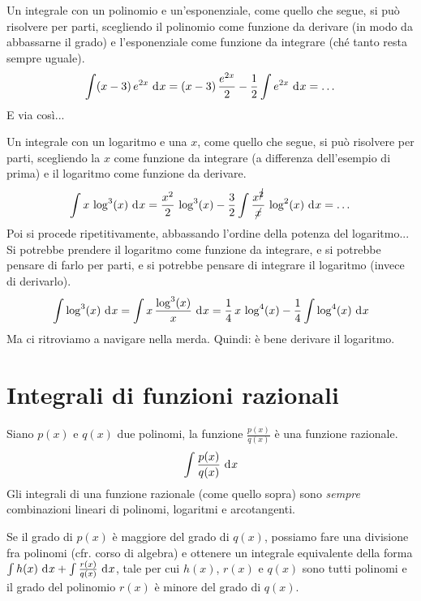 \begin{exmp}
Un integrale con un polinomio e un'esponenziale, come quello che segue, si pu\`o risolvere per parti, scegliendo il polinomio come funzione da derivare (in modo da abbassarne il grado) e l'esponenziale come funzione da integrare (ch\'e tanto resta sempre uguale).
\[
\int (x - 3) \, e^{2x} \dx =
(x - 3) \, \frac{e^{2x}}{2} - \frac{1}{2} \int e^{2x} \dx = \dots
\]
E via cos\`i...
\end{exmp}

\begin{exmp}
Un integrale con un logaritmo e una $x$, come quello che segue, si pu\`o risolvere per parti, scegliendo la $x$ come funzione da integrare (a differenza dell'esempio di prima) e il logaritmo come funzione da derivare.
\[
\int x \, \log^3 (x) \dx =
\frac{x^2}{2} \, \log^3 (x) - \frac{3}{2} \int \frac{x^{\cancel{2}}}{\cancel{x}} \, \log^2 (x) \dx = \dots
\]
Poi si procede ripetitivamente, abbassando l'ordine della potenza del logaritmo... Si potrebbe prendere il logaritmo come funzione da integrare, e si potrebbe pensare di farlo per parti, e si potrebbe pensare di integrare il logaritmo (invece di derivarlo).
\[
\int \log^3 (x) \dx =
\int x \, \frac{\log^3 (x)}{x} \dx =
\frac{1}{4} \, x \, \log^4 (x) - \frac{1}{4} \int \log^4 (x) \dx
\]
Ma ci ritroviamo a navigare nella merda. Quindi: \`e bene derivare il logaritmo.
\end{exmp}

\section{Integrali di funzioni razionali}

Siano $p(x)$ e $q(x)$ due polinomi, la funzione $\frac{p(x)}{q(x)}$ \`e una funzione razionale.
\[
\int \frac{p(x)}{q(x)} \dx
\]
Gli integrali di una funzione razionale (come quello sopra) sono \emph{sempre} combinazioni lineari di polinomi, logaritmi e arcotangenti.

Se il grado di $p(x)$ \`e maggiore del grado di $q(x)$, possiamo fare una divisione fra polinomi (cfr. corso di algebra) e ottenere un integrale equivalente della forma $\int h(x) \dx + \int \frac{r(x)}{q(x)} \dx$, tale per cui $h(x)$, $r(x)$ e $q(x)$ sono tutti polinomi e il grado del polinomio $r(x)$ \`e minore del grado di $q(x)$.

